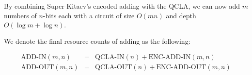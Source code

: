 By combining Super-Kitaev's encoded adding with the QCLA, we can now
add $m$ numbers of $n$-bits each with a circuit of size $O(mn)$ and
depth $O(\log m + \log n)$.

We denote the final resource counts of adding as the following:

\begin{eqnarray*}
\text{ADD-IN}(m, n) & = & \text{QCLA-IN}(n) + \text{ENC-ADD-IN}(m,n)\\
\text{ADD-OUT}(m, n) & = & \text{QCLA-OUT}(n) + \text{ENC-ADD-OUT}(m,n)\\
\end{eqnarray*}